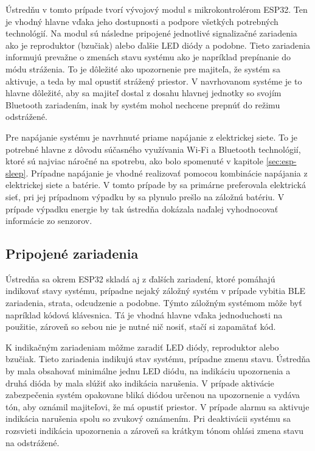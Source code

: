 Ústredňu v tomto prípade tvorí vývojový modul s mikrokontrolérom ESP32. Ten je vhodný hlavne vďaka jeho dostupnosti a podpore všetkých potrebných technológií. Na modul sú následne pripojené jednotlivé signalizačné zariadenia ako je reproduktor (bzučiak) alebo ďalšie LED diódy a podobne. Tieto zariadenia informujú prevažne o zmenách stavu systému ako je napríklad prepínanie do módu stráženia. To je dôležité ako upozornenie pre majiteľa, že systém sa aktivuje, a teda by mal opustiť strážený priestor. V navrhovanom systéme je to hlavne dôležité, aby sa majiteľ dostal z dosahu hlavnej jednotky so svojím Bluetooth zariadením, inak by systém mohol nechcene prepnúť do režimu odstrážené.

Pre napájanie systému je navrhnuté priame napájanie z elektrickej siete. To je potrebné hlavne z dôvodu súčasného využívania Wi-Fi a Bluetooth technológií, ktoré sú najviac náročné na spotrebu, ako bolo spomenuté v kapitole \ref{sec:esp-sleep}. Prípadne napájanie je vhodné realizovať pomocou kombinácie napájania z elektrickej siete a batérie. V tomto prípade by sa primárne preferovala elektrická sieť, pri jej prípadnom výpadku by sa plynulo prešlo na záložnú batériu. V prípade výpadku energie by tak ústredňa dokázala naďalej vyhodnocovať informácie zo senzorov.

\subsection{Pripojené zariadenia}

Ústredňa sa okrem ESP32 skladá aj z ďalších zariadení, ktoré pomáhajú indikovať stavy systému, prípadne nejaký záložný systém v prípade vybitia BLE zariadenia, strata, odcudzenie a podobne. Týmto záložným systémom môže byť napríklad kódová klávesnica. Tá je vhodná hlavne vďaka jednoduchosti na použitie, zároveň so sebou nie je nutné nič nosiť, stačí si zapamätať kód.

K indikačným zariadeniam môžme zaradiť LED diódy, reproduktor alebo bzučiak. Tieto zariadenia indikujú stav systému, prípadne zmenu stavu. Ústredňa by mala obsahovať minimálne jednu LED diódu, na indikáciu upozornenia a druhá dióda by mala slúžiť ako indikácia narušenia. V prípade aktivácie zabezpečenia systém opakovane bliká diódou určenou na upozornenie a vydáva tón, aby oznámil majiteľovi, že má opustiť priestor. V prípade alarmu sa aktivuje indikácia narušenia spolu so zvukový oznámením. Pri deaktivácii systému sa rozsvieti indikácia upozornenia a zároveň sa krátkym tónom ohlási zmena stavu na odstrážené.

